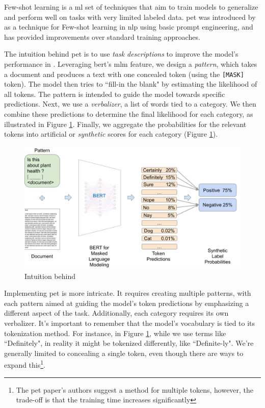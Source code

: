 \label{06_pet}

Few-shot learning is a \gls{ml} set of techniques that aim to train models to generalize and perform well on tasks with very limited labeled data.
\gls{pet} was introduced by  as a technique for Few-shot learning in \gls{nlp} using basic prompt engineering, and has provided improvements over standard training approaches.



The intuition behind \gls{pet} is to use \emph{task descriptions} to improve the model's performance in \textclassification{}. 
Leveraging \gls{bert}'s \gls{mlm} feature, 
we design a \emph{pattern}, which takes a document and produces a text with one concealed token (using the \texttt{[MASK]} token).
The model then tries to ``fill-in the blank" by estimating the likelihood of all tokens.
The pattern is intended to guide the model towards specific predictions. 
Next, we use a \emph{verbalizer}, a list of words tied to a category. 
We then combine these predictions to determine the final likelihood for each category, as illustrated in Figure \ref{fig:06_pet_intuition}.
Finally, we aggregate the probabilities for the relevant tokens into artificial or \emph{synthetic} scores for each category (Figure \ref{fig:06_pet_intuition}).

\begin{figure}
    \centering
    \includegraphics[width=\textwidth]{Figures/06/06_pet_intuition.png}
    \caption{Intuition behind \PET{}}
    \label{fig:06_pet_intuition}
\end{figure}


Implementing \gls{pet} is more intricate. It requires creating multiple patterns, with each pattern aimed at guiding the model's token predictions by emphasizing a different aspect of the task. Additionally, each category requires its own verbalizer. It's important to remember that the model's vocabulary is tied to its tokenization method. For instance, in Figure \ref{fig:06_pet_intuition}, while we use terms like ``Definitely", in reality it might be tokenized differently, like ``Definite-ly". We're generally limited to concealing a single token, even though there are ways to expand this\footnote{The \gls{pet} paper's authors suggest a method for multiple tokens, however, the trade-off is that the training time increases significantly}.




